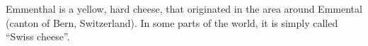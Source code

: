 Emmenthal is a yellow, hard cheese, that originated in the area around Emmental (canton of Bern, Switzerland).
In some parts of the world, it is simply called ``Swiss cheese''.